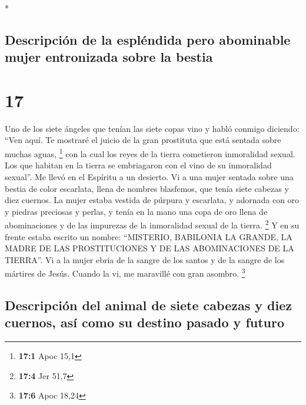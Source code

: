 \begin{paracol}{2}
\begin{otherlanguage}{english}
\end{otherlanguage}

\switchcolumn[0]*

\hypertarget{descripciuxf3n-de-la-espluxe9ndida-pero-abominable-mujer-entronizada-sobre-la-bestia}{%
\subsection{Descripción de la espléndida pero abominable mujer
entronizada sobre la
bestia}\label{descripciuxf3n-de-la-espluxe9ndida-pero-abominable-mujer-entronizada-sobre-la-bestia}}

\hypertarget{section-32}{%
\section{17}\label{section-32}}

 Uno de los siete ángeles que tenían las siete copas vino
y habló conmigo diciendo: ``Ven aquí. Te mostraré el juicio de la gran
prostituta que está sentada sobre muchas aguas, \footnote{\textbf{17:1}
  Apoc 15,1}  con la cual los reyes de la tierra
cometieron inmoralidad sexual. Los que habitan en la tierra se
embriagaron con el vino de su inmoralidad sexual''.  Me
llevó en el Espíritu a un desierto. Vi a una mujer sentada sobre una
bestia de color escarlata, llena de nombres blasfemos, que tenía siete
cabezas y diez cuernos.  La mujer estaba vestida de
púrpura y escarlata, y adornada con oro y piedras preciosas y perlas, y
tenía en la mano una copa de oro llena de abominaciones y de las
impurezas de la inmoralidad sexual de la tierra. \footnote{\textbf{17:4}
  Jer 51,7}  Y en su frente estaba escrito un nombre:
``MISTERIO, BABILONIA LA GRANDE, LA MADRE DE LAS PROSTITUCIONES Y DE LAS
ABOMINACIONES DE LA TIERRA''.  Vi a la mujer ebria de la
sangre de los santos y de la sangre de los mártires de Jesús. Cuando la
vi, me maravillé con gran asombro. \footnote{\textbf{17:6} Apoc 18,24}

\hypertarget{descripciuxf3n-del-animal-de-siete-cabezas-y-diez-cuernos-asuxed-como-su-destino-pasado-y-futuro}{%
\subsection{Descripción del animal de siete cabezas y diez cuernos, así
como su destino pasado y
futuro}\label{descripciuxf3n-del-animal-de-siete-cabezas-y-diez-cuernos-asuxed-como-su-destino-pasado-y-futuro}}


\end{paracol}
